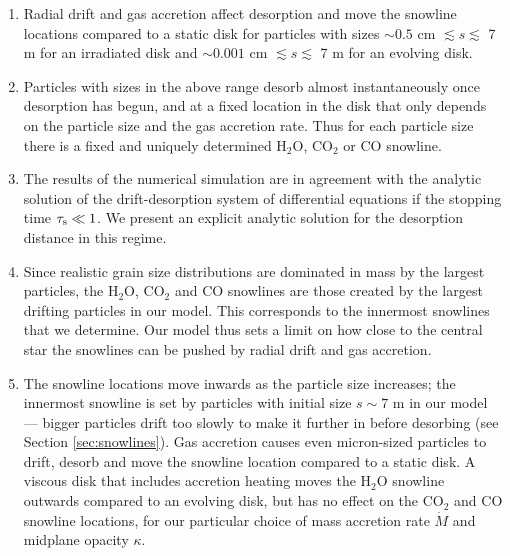 \documentclass[apj]{emulateapj}
\begin{document}
\begin{enumerate}
\item Radial drift and gas accretion affect desorption and move the snowline locations compared to a static disk for particles with sizes $\sim$$0.5$ cm $\lesssim s \lesssim$ 7 m for an irradiated disk and $\sim$$0.001$ cm $\lesssim s \lesssim$ 7 m for an evolving disk. %

\item Particles with sizes in the above range desorb almost instantaneously once desorption has begun, and at a fixed location in the disk that only depends on the particle size and the gas accretion rate. Thus for each particle size there is a fixed and uniquely determined H$_2$O, CO$_2$ or CO snowline. 

\item The results of the numerical simulation are in agreement with the analytic solution of the drift-desorption system of differential equations if the stopping time $\tau_{\rm s} \ll 1$. We present an explicit analytic solution for the desorption distance in this regime.  



\item Since realistic grain size distributions are dominated in mass by the largest particles, the H$_2$O, CO$_2$ and CO snowlines are those created by the largest drifting particles in our model. This corresponds to the innermost snowlines that we determine. Our model thus sets a limit on how close to the central star the snowlines can be pushed by radial drift and gas accretion.

\item The snowline locations move inwards as the particle size increases; the innermost snowline is set by particles with initial size $s \sim 7$ m in our model --- bigger particles drift too slowly to make it further in before desorbing (see Section \ref{sec:snowlines}). Gas accretion causes even micron-sized particles to drift, desorb and move the snowline location compared to a static disk. A viscous disk that includes accretion heating moves the H$_2$O snowline outwards compared to an evolving disk, but has no effect on the CO$_2$ and CO snowline locations, for our particular choice of mass accretion rate $\dot{M}$ and midplane opacity $\kappa$. %


\end{enumerate}
\end{document}
